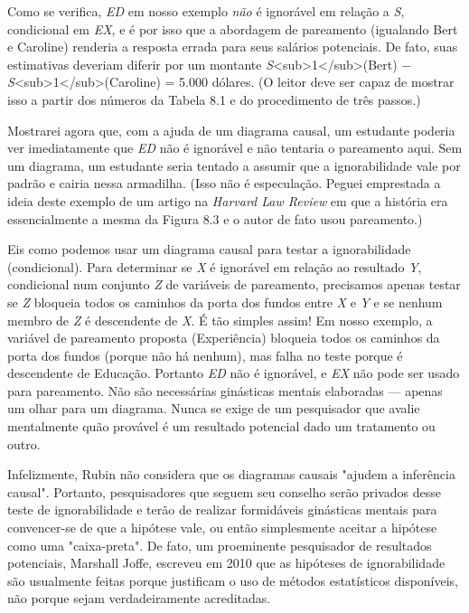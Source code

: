 \documentclass[11pt,a5paper,twoside]{book}
\begin{document}
Como se verifica, \textit{ED} em nosso exemplo \textit{não} é ignorável em relação a \textit{S}, condicional em \textit{EX}, e é por isso que a abordagem de pareamento (igualando Bert e Caroline) renderia a resposta errada para seus salários potenciais. De fato, suas estimativas deveriam diferir por um montante \textit{S}<sub>1</sub>(Bert) − \textit{S}<sub>1</sub>(Caroline) = 5.000 dólares. (O leitor deve ser capaz de mostrar isso a partir dos números da Tabela 8.1 e do procedimento de três passos.)

Mostrarei agora que, com a ajuda de um diagrama causal, um estudante poderia ver imediatamente que \textit{ED} não é ignorável e não tentaria o pareamento aqui. Sem um diagrama, um estudante seria tentado a assumir que a ignorabilidade vale por padrão e cairia nessa armadilha. (Isso não é especulação. Peguei emprestada a ideia deste exemplo de um artigo na \textit{Harvard Law Review} em que a história era essencialmente a mesma da Figura 8.3 e o autor de fato usou pareamento.)

Eis como podemos usar um diagrama causal para testar a ignorabilidade (condicional). Para determinar se \textit{X} é ignorável em relação ao resultado \textit{Y}, condicional num conjunto \textit{Z} de variáveis de pareamento, precisamos apenas testar se \textit{Z} bloqueia todos os caminhos da porta dos fundos entre \textit{X} e \textit{Y} e se nenhum membro de \textit{Z} é descendente de \textit{X}. É tão simples assim! Em nosso exemplo, a variável de pareamento proposta (Experiência) bloqueia todos os caminhos da porta dos fundos (porque não há nenhum), mas falha no teste porque é descendente de Educação. Portanto \textit{ED} não é ignorável, e \textit{EX} não pode ser usado para pareamento. Não são necessárias ginásticas mentais elaboradas — apenas um olhar para um diagrama. Nunca se exige de um pesquisador que avalie mentalmente quão provável é um resultado potencial dado um tratamento ou outro.

Infelizmente, Rubin não considera que os diagramas causais "ajudem a inferência causal". Portanto, pesquisadores que seguem seu conselho serão privados desse teste de ignorabilidade e terão de realizar formidáveis ginásticas mentais para convencer-se de que a hipótese vale, ou então simplesmente aceitar a hipótese como uma "caixa-preta". De fato, um proeminente pesquisador de resultados potenciais, Marshall Joffe, escreveu em 2010 que as hipóteses de ignorabilidade são usualmente feitas porque justificam o uso de métodos estatísticos disponíveis, não porque sejam verdadeiramente acreditadas.
\end{document}
